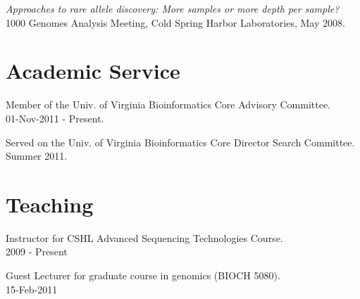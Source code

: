 \documentclass[margin,line]{cv}
\begin{document}
\begin{resume}
    \vspace{-2mm}
    \textit{Approaches to rare allele discovery: More samples or more depth per sample? } \\
    1000 Genomes Analysis Meeting, Cold Spring Harbor Laboratories, May 2008.
    
    \section{\mysidestyle Academic Service}
    
    Member of the Univ. of Virginia Bioinformatics Core Advisory Committee.\\
    01-Nov-2011 - Present.
    
    \vspace{-2mm}
    Served on the Univ. of Virginia Bioinformatics Core Director Search Committee. \\
    Summer 2011.



    \section{\mysidestyle Teaching}
    Instructor for CSHL Advanced Sequencing Technologies Course.\\
    2009 - Present
    
    \vspace{-2mm}
    Guest Lecturer for graduate course in genomics (BIOCH 5080).\\
    15-Feb-2011
    
    
    

\end{resume}
\end{document}
